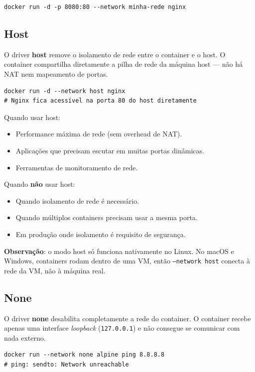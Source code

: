 \begin{verbatim}
docker run -d -p 8080:80 --network minha-rede nginx
\end{verbatim}

\subsection{Host}

O driver \textbf{host} remove o isolamento de rede entre o container e o host. O container compartilha diretamente a pilha de rede da máquina host --- não há NAT nem mapeamento de portas.

\begin{verbatim}
docker run -d --network host nginx
# Nginx fica acessível na porta 80 do host diretamente
\end{verbatim}

Quando usar host:
\begin{itemize}
    \item Performance máxima de rede (sem overhead de NAT).
    \item Aplicações que precisam escutar em muitas portas dinâmicas.
    \item Ferramentas de monitoramento de rede.
\end{itemize}

Quando \textbf{não} usar host:
\begin{itemize}
    \item Quando isolamento de rede é necessário.
    \item Quando múltiplos containers precisam usar a mesma porta.
    \item Em produção onde isolamento é requisito de segurança.
\end{itemize}

\textbf{Observação}: o modo host só funciona nativamente no Linux. No macOS e Windows, containers rodam dentro de uma VM, então \texttt{--network host} conecta à rede da VM, não à máquina real.

\subsection{None}

O driver \textbf{none} desabilita completamente a rede do container. O container recebe apenas uma interface \textit{loopback} (\texttt{127.0.0.1}) e não consegue se comunicar com nada externo.

\begin{verbatim}
docker run --network none alpine ping 8.8.8.8
# ping: sendto: Network unreachable
\end{verbatim}

